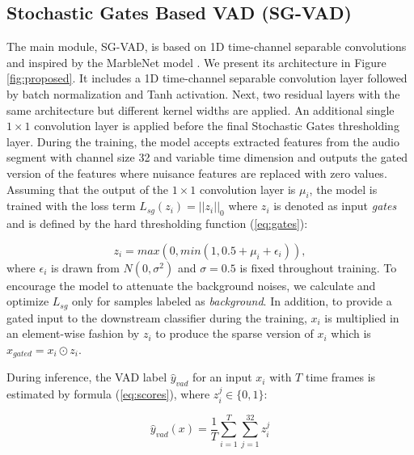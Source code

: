\documentclass{article}
\begin{document}
\subsection{Stochastic Gates Based VAD (SG-VAD)}
\label{sec:sgvad}

The main module, SG-VAD, is based on 1D time-channel separable convolutions and inspired by the MarbleNet model \cite{jia2021marblenet}. We present its architecture in Figure \ref{fig:proposed}. It includes a 1D time-channel separable convolution layer followed by batch normalization and Tanh activation. Next, two residual layers with the same architecture but different kernel widths are applied. An additional single $1\times1$ convolution layer is applied before the final Stochastic Gates thresholding layer.
During the training, the model accepts extracted features from the audio segment with channel size 32 and variable time dimension and outputs the gated version of the features where nuisance features are replaced with zero values. Assuming that the output of the $1\times1$ convolution layer is $\mu_i$, the model is trained with the loss term $L_{sg}(z_i)=||z_i||_0$ where $z_i$ is denoted as input \textit{gates} and is defined by the hard thresholding function (\ref{eq:gates}):

\begin{equation}\label{eq:gates}
 z_i = max(0, min(1, 0.5 + \mu_i + \epsilon_i)),
\end{equation}
where $\epsilon_i$ is drawn from $N(0, \sigma^2)$ and $\sigma=0.5$ is fixed throughout training. To encourage the model to attenuate the background noises, we calculate and optimize $L_{sg}$ only for samples labeled as \textit{background}. In addition, to provide a gated input to the downstream classifier during the training, $x_i$ is multiplied in an element-wise fashion by $z_i$ to produce the sparse version of $x_i$ which is $x_{gated}=x_i \odot z_i$.

During inference, the VAD label $\hat{y}_{vad}$ for an input $x_i$ with $T$ time frames is estimated by formula (\ref{eq:scores}), where $z_i^j \in \{0,1\}$:

\begin{equation}\label{eq:scores}
 \hat{y}_{vad}(x)= \frac{1}{T} \sum_{i=1}^{T} \sum_{j=1}^{32} z_i^j
\end{equation}
\end{document}
